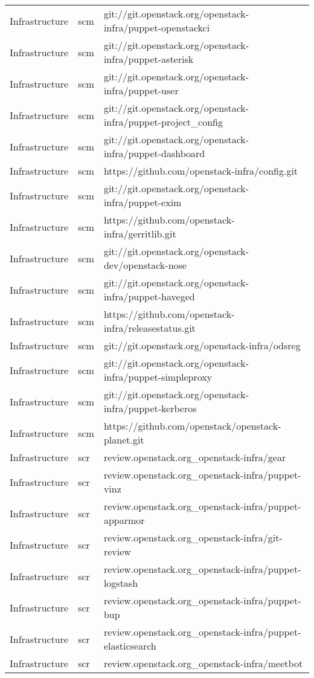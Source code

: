 \begin{center}
\begin{longtable}{|p{4cm}|p{1cm}|p{10cm}|}
Infrastructure&scm&git://git.openstack.org/openstack-infra/puppet-openstackci\\
Infrastructure&scm&git://git.openstack.org/openstack-infra/puppet-asterisk\\
Infrastructure&scm&git://git.openstack.org/openstack-infra/puppet-user\\
Infrastructure&scm&git://git.openstack.org/openstack-infra/puppet-project\_config\\
Infrastructure&scm&git://git.openstack.org/openstack-infra/puppet-dashboard\\
Infrastructure&scm&https://github.com/openstack-infra/config.git\\
Infrastructure&scm&git://git.openstack.org/openstack-infra/puppet-exim\\
Infrastructure&scm&https://github.com/openstack-infra/gerritlib.git\\
Infrastructure&scm&git://git.openstack.org/openstack-dev/openstack-nose\\
Infrastructure&scm&git://git.openstack.org/openstack-infra/puppet-haveged\\
Infrastructure&scm&https://github.com/openstack-infra/releasestatus.git\\
Infrastructure&scm&git://git.openstack.org/openstack-infra/odsreg\\
Infrastructure&scm&git://git.openstack.org/openstack-infra/puppet-simpleproxy\\
Infrastructure&scm&git://git.openstack.org/openstack-infra/puppet-kerberos\\
Infrastructure&scm&https://github.com/openstack/openstack-planet.git\\
Infrastructure&scr&review.openstack.org\_openstack-infra/gear\\
Infrastructure&scr&review.openstack.org\_openstack-infra/puppet-vinz\\
Infrastructure&scr&review.openstack.org\_openstack-infra/puppet-apparmor\\
Infrastructure&scr&review.openstack.org\_openstack-infra/git-review\\
Infrastructure&scr&review.openstack.org\_openstack-infra/puppet-logstash\\
Infrastructure&scr&review.openstack.org\_openstack-infra/puppet-bup\\
Infrastructure&scr&review.openstack.org\_openstack-infra/puppet-elasticsearch\\
Infrastructure&scr&review.openstack.org\_openstack-infra/meetbot\\

\end{longtable}
\end{center}
